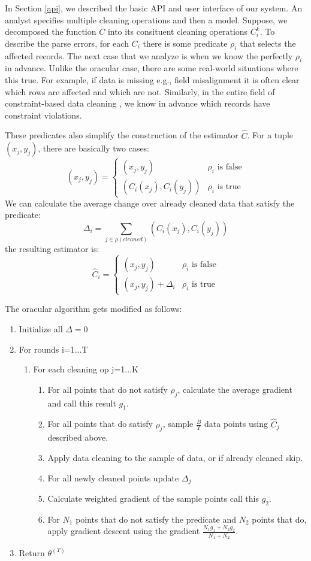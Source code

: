 In Section \ref{api}, we described the basic API and user interface of our system.
An analyst specifies multiple cleaning operations and then a model.
Suppose, we decomposed the function $C$ into its consituent cleaning operations ${C}_i^{k}$.
To describe the parse errors, for each $C_i$ there is some predicate $\rho_i$ that selects the affected records.
The next case that we analyze is when we know the perfectly $\rho_i$ in advance.
Unlike the oracular case, there are some real-world situations where this true.
For example, if data is missing e.g., field misalignment it is often clear which rows are affected and which are not.
Similarly, in the entire field of constraint-based data cleaning \cite{nadeef}, we know in advance which records have constraint violations.

These predicates also simplify the construction of the estimator $\hat{C}$. 
For a tuple $(x_j,y_j)$, there are basically two cases:
\[
(x_j,y_j)= \begin{cases} (x_j,y_j) &\rho_i \text{ is false} \\ 
(C_i(x_j),C_i(y_j)) & \rho_i \text{ is true} 
\end{cases} 
\]
We can calculate the average change over already cleaned data that satisfy the predicate:
\[
\Delta_i = \sum_{j \in \rho(cleaned)} (C_i(x_j),C_i(y_j))
\]
the resulting estimator is:
\[
\hat{C}_i= \begin{cases} (x_j,y_j) &\rho_i \text{ is false} \\ 
(x_j,y_j) + \Delta_i & \rho_i \text{ is true} 
\end{cases} 
\]

The oracular algorithm gets modified as follows:
\begin{enumerate}[noitemsep]
\item Initialize all $\Delta = 0$
\item For rounds i=1...T
\begin{enumerate}
	\item For each cleaning op j=1...K
	\begin{enumerate}
		\item For all points that do not satisfy $\rho_j$, calculate the average gradient and call this result $g_1$.
		\item For all points that do satisfy $\rho_j$, sample $\frac{B}{T}$ data points using $\hat{C}_j$ described above.
		\item Apply data cleaning to the sample of data, or if already cleaned skip.
		\item For all newly cleaned points update $\Delta_j$
		\item Calculate weighted gradient of the sample points call this $g_2$.
		\item For $N_1$ points that do not satisfy the predicate and $N_2$ points that do,  apply gradient descent using the gradient $\frac{N_1g_1 + N_2g_2}{N_1 + N_2}$.
	\end{enumerate}
\end{enumerate}
\item Return $\theta^{(T)}$
\end{enumerate} 

